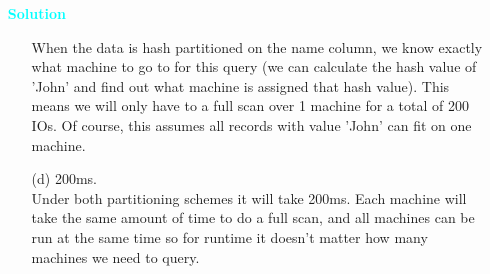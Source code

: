 \documentclass[10pt]{article}
\newenvironment{solution}
    { \begin{mdframed}[backgroundcolor=gray!10] \textcolor{cyan}{\textbf{Solution}} \\}
    {  \end{mdframed}}
\begin{document}
\begin{enumerate}
\begin{solution}
\begin{itemize}
			            When the data is hash partitioned on the name column, we know exactly what machine to
			            go to for this query (we can calculate the hash value of 'John' and find out what machine is
			            assigned that hash value). This means we will only have to a full scan over 1 machine for a total
			            of 200 IOs. Of course, this assumes all records with value 'John' can fit on one machine.
			      \item[(d)] 200ms. \\
			            Under both partitioning schemes it will take 200ms. Each machine will take the same amount
			            of time to do a full scan, and all machines can be run at the same time so for runtime it doesn't
			            matter how many machines we need to query.
		      \end{itemize}
	      \end{solution}


\end{enumerate}
\end{document}
